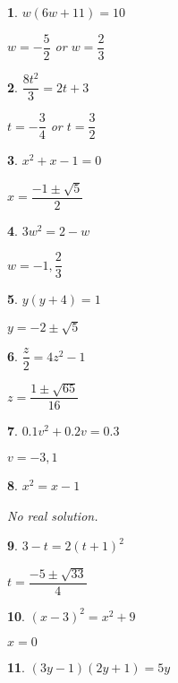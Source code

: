 \documentclass{amsbook}
\newtheorem{exc}{}
\newenvironment{ex}{\begin{exc}\normalfont}{\end{exc}}
\numberwithin{section}{chapter}
\numberwithin{equation}{chapter}
\begin{document}
\begin{multicols}{2}
\begin{ex}
	$w(6w+11) = 10$
	\begin{sol}
		$w = -\dfrac{5}{2}$ or $w = \dfrac{2}{3}$
	\end{sol}
\end{ex}
\begin{ex}
	$\dfrac{8t^2}{3} = 2t+3$
	\begin{sol}
		$t = -\dfrac{3}{4}$ or $t = \dfrac{3}{2}$
	\end{sol}
\end{ex}
\begin{ex}
	$x^2 + x - 1 = 0$
	\begin{sol}
	$x = \dfrac{-1 \pm \sqrt{5}}{2}$	
	\end{sol}
\end{ex}
\begin{ex}
	$3w^2 = 2-w$
	\begin{sol}
		$w = -1, \dfrac{2}{3}$
	\end{sol}
\end{ex}
\begin{ex}
	$y(y+4) = 1$
	\begin{sol}
		$y = -2 \pm \sqrt{5}$
	\end{sol}
\end{ex}
\begin{ex}
	$\dfrac{z}{2} = 4z^2-1$
	\begin{sol}
		$z = \dfrac{1 \pm \sqrt{65}}{16}$
	\end{sol}
\end{ex}
\begin{ex}
	$0.1v^2 + 0.2v = 0.3$
	\begin{sol}
		$v = -3, 1$
	\end{sol}
\end{ex}
\begin{ex}
	$x^2 = x - 1$
	\begin{sol}
		No real solution.
	\end{sol}
\end{ex}
\begin{ex}
	$3-t = 2(t+1)^2$
	\begin{sol}
		$t = \dfrac{-5 \pm \sqrt{33}}{4}$
	\end{sol}
\end{ex}
\begin{ex}
	$(x-3)^2 = x^2+9$
	\begin{sol}
		$x = 0$ 
	\end{sol}
\end{ex}
\begin{ex}
	$(3y-1)(2y+1) = 5y$
	\begin{sol}

\end{sol}
\end{ex}
\end{multicols}
\end{document}
